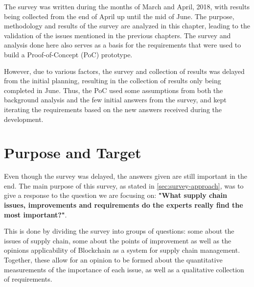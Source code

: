 The survey was written during the months of March and April, 2018, with results being collected from the end of April up until the mid of June. The purpose, methodology and results of the survey are analyzed in this chapter, leading to the validation of the issues mentioned in the previous chapters. The survey and analysis done here also serves as a basis for the requirements that were used to build a Proof-of-Concept (PoC) prototype. 

However, due to various factors, the survey and collection of results was delayed from the initial planning, resulting in the collection of results only being completed in June. Thus, the PoC used some assumptions from both the background analysis and the few initial answers from the survey, and kept iterating the requirements based on the new answers received during the development. 




\section{Purpose and Target}
Even though the survey was delayed, the answers given are still important in the end. The main purpose of this survey, as stated in \ref{sec:survey-approach}, was to give a response to the question we are focusing on: \textbf{"What supply chain issues, improvements and requirements do the experts really find the most important?"}. 


This is done by dividing the survey into groups of questions: some about the issues of supply chain, some about the points of improvement as well as the opinions applicability of Blockchain as a system for supply chain management. Together, these allow for an opinion to be formed about the quantitative measurements of the importance of each issue, as well as a qualitative collection of requirements.

